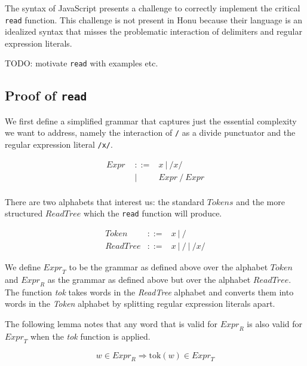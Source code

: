 \documentclass[preprint,10pt]{sigplanconf}
\begin{document}
The syntax of JavaScript presents a challenge to correctly implement
the critical \texttt{read} function. This challenge is not present in Honu
because their language is an idealized syntax that misses the
problematic interaction of delimiters and regular expression literals.

TODO: motivate \texttt{read} with examples etc.

\subsection{Proof of \texttt{read}}
\label{sec-3-1}

We first define a simplified grammar that captures just the essential
complexity we want to address, namely the interaction of \texttt{/} as a
divide punctuator and the regular expression literal \texttt{/x/}.

\[
  \begin{array}{rrl}
    \textit{Expr }&::=& x ~|~ /x/ \\
    &|& \textit{Expr}~/~\textit{Expr}\\
  \end{array}
\]

There are two alphabets that interest us: the standard \(
\mathit{Tokens} \) and the more structured \( \mathit{ReadTree} \)
which the \texttt{read} function will produce.

\[
\begin{array}{rcl}
  \textit{Token} &::=& x ~|~ / \\
  \textit{ReadTree} &::=& x ~|~ / ~|~ /x/
\end{array}
\]

We define \( \textit{Expr}_T \) to be the grammar as defined above
over the alphabet \( \textit{Token} \) and \( \textit{Expr}_R \) as
the grammar as defined above but over the alphabet \(
\textit{ReadTree} \). The function \textit{tok} takes words in the
\textit{ReadTree} alphabet and converts them into words in the
\textit{Token} alphabet by splitting regular expression literals
apart.

The following lemma notes that any word that is valid for \(
\textit{Expr}_R \) is also valid for \( \textit{Expr}_T \) when the
\textit{tok} function is applied.

  \begin{lemma}[]\mbox{}
\[
    w \in \textit{Expr}_R
    \Rightarrow
    \textrm{tok}(w) \in \textit{Expr}_T
\]
  \end{lemma}
\end{document}
